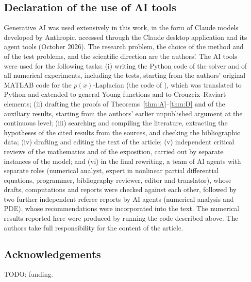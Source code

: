 \documentclass[11pt]{amsart}
\theoremstyle{definition}
\theoremstyle{remark}
\numberwithin{equation}{section}
\begin{document}
\subsection*{Declaration of the use of AI tools}
Generative AI was used extensively in this work, in the form of Claude models developed by Anthropic, accessed through the Claude desktop application and its agent tools (October 2026). The research problem, the choice of the method and of the test problems, and the scientific direction are the authors'. The AI tools were used for the following tasks: (i) writing the Python code of the solver and of all numerical experiments, including the tests, starting from the authors' original MATLAB code for the $p(x)$-Laplacian (the code of \cite{AragonFBRubio2023}), which was translated to Python and extended to general Young functions and to Crouzeix--Raviart elements; (ii) drafting the proofs of Theorems~\ref{thm:A}--\ref{thm:D} and of the auxiliary results, starting from the authors' earlier unpublished argument at the continuous level; (iii) searching and compiling the literature, extracting the hypotheses of the cited results from the sources, and checking the bibliographic data; (iv) drafting and editing the text of the article; (v) independent critical reviews of the mathematics and of the exposition, carried out by separate instances of the model; and (vi) in the final rewriting, a team of AI agents with separate roles (numerical analyst, expert in nonlinear partial differential equations, programmer, bibliography reviewer, editor and translator), whose drafts, computations and reports were checked against each other, followed by two further independent referee reports by AI agents (numerical analysis and PDE), whose recommendations were incorporated into the text.
 The numerical results reported here were produced by running the code described above. The authors take full responsibility for the content of the article. %

\subsection*{Acknowledgements}
TODO: funding.
\end{document}

